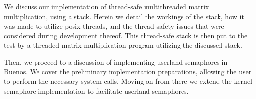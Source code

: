 %
%
%

We discuss our implementation of thread-safe multithreaded matrix
multiplication, using a stack. Herein we detail the workings of the stack,
how it was made to utilize posix threads, and the thread-safety issues that
were considered during development thereof. This thread-safe stack is then
put to the test by a threaded matrix multiplication program utilizing the
discussed stack.

Then, we proceed to a discussion of implementing userland semaphores in
Buenos. We cover the preliminary implementation preparations, allowing the
user to perform the necessary system calls. Moving on from there we extend
the kernel semaphore implementation to facilitate userland semaphores.
